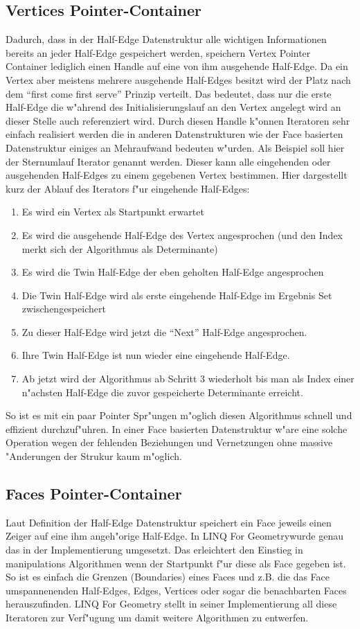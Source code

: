 \documentclass[pagesize, paper=a4, fontsize=12pt,titlepage=true, headings=small, headnosepline, abstractoff, liststotoc, nochapterprefix, plainheadsepline]{scrreprt}
\newcommand{\LFG}{LINQ For Geometry}
\newcommand{\LFGS}{LINQ For Geometry }
\newcommand{\HES}{Half-Edge Datenstruktur }
\begin{document}
		\subsection {Vertices Pointer-Container}
			Dadurch, dass in der Half-Edge Datenstruktur alle wichtigen Informationen bereits an jeder Half-Edge gespeichert werden, speichern Vertex Pointer Container lediglich einen Handle auf eine von ihm ausgehende Half-Edge. Da ein Vertex aber meistens mehrere ausgehende Half-Edges besitzt wird der Platz nach dem "`first come first serve"' Prinzip verteilt. Das bedeutet, dass nur die erste Half-Edge die w"ahrend des Initialisierungslauf an den Vertex angelegt wird an dieser Stelle auch referenziert wird. Durch diesen Handle k"onnen Iteratoren sehr einfach realisiert werden die in anderen Datenstrukturen wie der Face basierten Datenstruktur einiges an Mehraufwand bedeuten w"urden. Als Beispiel soll hier der Sternumlauf Iterator genannt werden. Dieser kann alle eingehenden oder ausgehenden Half-Edges zu einem gegebenen Vertex bestimmen. Hier dargestellt kurz der Ablauf des Iterators f"ur eingehende Half-Edges:
\begin{enumerate}
\item Es wird ein Vertex als Startpunkt erwartet
\item Es wird die ausgehende Half-Edge des Vertex angesprochen (und den Index merkt sich der Algorithmus als Determinante)
\item Es wird die Twin Half-Edge der eben geholten Half-Edge angesprochen
\item Die Twin Half-Edge wird als erste eingehende Half-Edge im Ergebnis Set zwischengespeichert
\item Zu dieser Half-Edge wird jetzt die "`Next"' Half-Edge angesprochen.
\item Ihre Twin Half-Edge ist nun wieder eine eingehende Half-Edge.
\item Ab jetzt wird der Algorithmus ab Schritt 3 wiederholt bis man als Index einer n"achsten Half-Edge die zuvor gespeicherte Determinante erreicht.
\end{enumerate}

So ist es mit ein paar Pointer Spr"ungen m"oglich diesen Algorithmus schnell und effizient durchzuf"uhren. In einer Face basierten Datenstruktur w"are eine solche Operation wegen der fehlenden Beziehungen und Vernetzungen ohne massive "Anderungen der Strukur kaum m"oglich.
		\subsection {Faces Pointer-Container}
			Laut Definition der \HES speichert ein Face jeweils einen Zeiger auf eine ihm angeh"orige Half-Edge. In \LFG wurde genau das in der Implementierung umgesetzt. Das erleichtert den Einstieg in manipulations Algorithmen wenn der Startpunkt f"ur diese als Face gegeben ist. So ist es einfach die Grenzen (Boundaries) eines Faces und z.B. die das Face umspannenenden Half-Edges, Edges, Vertices oder sogar die benachbarten Faces herauszufinden. \LFGS stellt in seiner Implementierung all diese Iteratoren zur Verf"ugung um damit weitere Algorithmen zu entwerfen.
\end{document}
